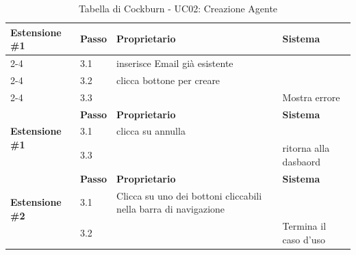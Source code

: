 \documentclass{article}
\begin{document}
\begin{table}[H]
\begin{tabular}{|p{3cm}|l|p{4.5cm}|p{4.5cm}|}
\hline
\multirow{3}{3cm}{\textbf{Estensione \#1}} 
   & \textbf{Passo} & \textbf{Proprietario} & \textbf{Sistema} \\ \cline{2-4}
   & 3.1 & inserisce Email già esistente & \\ \cline{2-4}
   & 3.2 & clicca bottone per creare & \\ \cline{2-4}
   & 3.3 & & Mostra errore \\ \hline
   \multirow{3}{3cm}{\textbf{Estensione \#1}} 
   & \textbf{Passo} & \textbf{Proprietario} & \textbf{Sistema} \\ \cline{2-4}
   & 3.1 & clicca su annulla & \\ \cline{2-4}
   & 3.3 & & ritorna alla dasbaord \\ \hline
\multirow{3}{3cm}{\textbf{Estensione \#2}} 
   & \textbf{Passo} & \textbf{Proprietario} & \textbf{Sistema} \\ \cline{2-4}
   & 3.1 & Clicca su uno dei bottoni \newline cliccabili nella barra di navigazione
 & \\ \cline{2-4}
   & 3.2 & & Termina il caso d’uso \\ \hline
\end{tabular}
\caption{Tabella di Cockburn - UC02: Creazione Agente}
\end{table}
\clearpage
\end{document}
